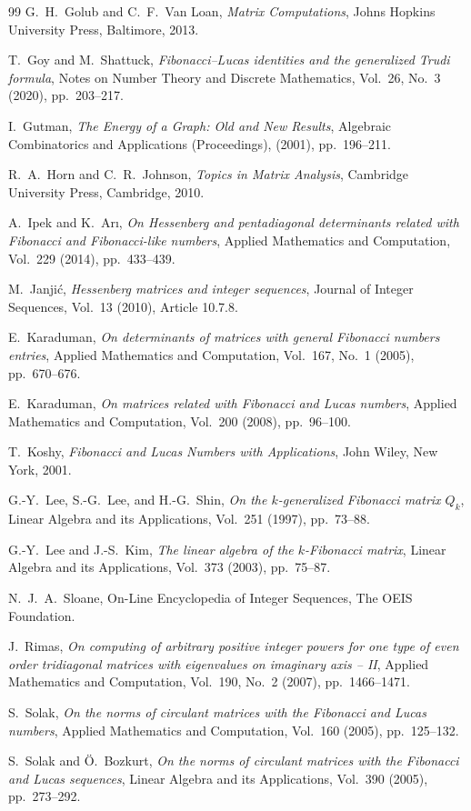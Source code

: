 \documentclass[11pt]{birkjour}
\theoremstyle{definition}
\theoremstyle{remark}
\numberwithin{equation}{section}
\begin{document}
\begin{thebibliography}{99}
G.~H.~Golub and C.~F.~Van Loan,
\emph{Matrix Computations},
Johns Hopkins University Press, Baltimore, 2013.

T.~Goy and M.~Shattuck,
\emph{Fibonacci--Lucas identities and the generalized Trudi formula},
Notes on Number Theory and Discrete Mathematics,
Vol.~26, No.~3 (2020), pp.~203--217.

I.~Gutman,
\emph{The Energy of a Graph: Old and New Results},
Algebraic Combinatorics and Applications (Proceedings),
(2001), pp.~196--211.

R.~A.~Horn and C.~R.~Johnson,
\emph{Topics in Matrix Analysis},
Cambridge University Press, Cambridge, 2010.

A.~Ipek and K.~Ar{\i},
\emph{On Hessenberg and pentadiagonal determinants related with Fibonacci and Fibonacci-like numbers},
Applied Mathematics and Computation,
Vol.~229 (2014), pp.~433--439.

M.~Janji\'c,
\emph{Hessenberg matrices and integer sequences},
Journal of Integer Sequences,
Vol.~13 (2010), Article 10.7.8.

E.~Karaduman,
\emph{On determinants of matrices with general Fibonacci numbers entries},
Applied Mathematics and Computation,
Vol.~167, No.~1 (2005), pp.~670--676.

E.~Karaduman,
\emph{On matrices related with Fibonacci and Lucas numbers},
Applied Mathematics and Computation,
Vol.~200 (2008), pp.~96--100.

T.~Koshy,
\emph{Fibonacci and Lucas Numbers with Applications},
John Wiley, New York, 2001.

G.-Y.~Lee, S.-G.~Lee, and H.-G.~Shin,
\emph{On the $k$-generalized Fibonacci matrix $Q_k$},
Linear Algebra and its Applications,
Vol.~251 (1997), pp.~73--88.

G.-Y.~Lee and J.-S.~Kim,
\emph{The linear algebra of the $k$-Fibonacci matrix},
Linear Algebra and its Applications,
Vol.~373 (2003), pp.~75--87.

N.~J.~A.~Sloane,
On-Line Encyclopedia of Integer Sequences,
The OEIS Foundation.

J.~Rimas,
\emph{On computing of arbitrary positive integer powers for one type of even order tridiagonal matrices with eigenvalues on imaginary axis -- II},
Applied Mathematics and Computation,
Vol.~190, No.~2 (2007), pp.~1466--1471.

S.~Solak,
\emph{On the norms of circulant matrices with the Fibonacci and Lucas numbers},
Applied Mathematics and Computation,
Vol.~160 (2005), pp.~125--132.

S.~Solak and \"O.~Bozkurt,
\emph{On the norms of circulant matrices with the Fibonacci and Lucas sequences},
Linear Algebra and its Applications,
Vol.~390 (2005), pp.~273--292.

\end{thebibliography}
\end{document}
